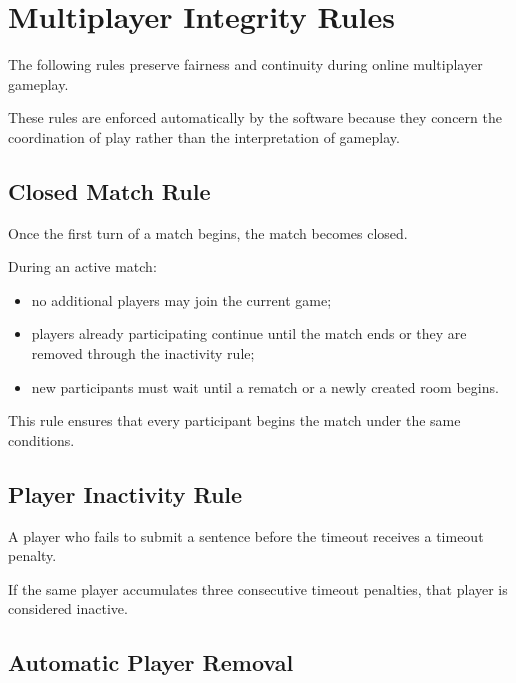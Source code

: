 \documentclass[11pt,a4paper]{article}
\begin{document}

\section{Multiplayer Integrity Rules}

The following rules preserve fairness and continuity during online multiplayer gameplay.

These rules are enforced automatically by the software because they concern the coordination of play rather than the interpretation of gameplay.


\subsection{Closed Match Rule}

Once the first turn of a match begins, the match becomes closed.

During an active match:

\begin{itemize}
    \item no additional players may join the current game;
    \item players already participating continue until the match ends or they are removed through the inactivity rule;
    \item new participants must wait until a rematch or a newly created room begins.
\end{itemize}

This rule ensures that every participant begins the match under the same conditions.


\subsection{Player Inactivity Rule}

A player who fails to submit a sentence before the timeout receives a timeout penalty.

If the same player accumulates three consecutive timeout penalties, that player is considered inactive.


\subsection{Automatic Player Removal}
\end{document}
